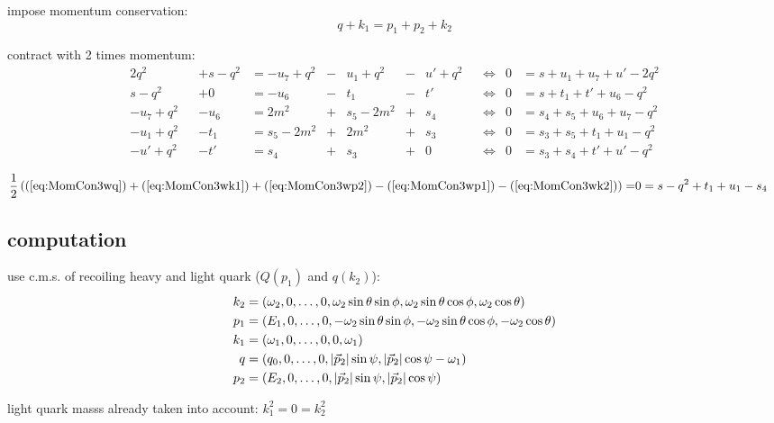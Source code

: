 \documentclass[
  ngerman,		%
  a4paper,		%
  11pt,			%
  DIV=12,		%
  parskip=half  	%
]{scrartcl}
\begin{document}
impose momentum conservation:
\begin{equation}
q+k_1 = p_1+p_2+k_2
\end{equation}

contract with 2 times momentum:
\begin{align}
2q^2 && +s-q^2 &=-u_7+q^2 &-& u_1+q^2 &-& u'+q^2 &&\Leftrightarrow &0 &=s+u_1+u_7+u'-2q^2 \label{eq:MomCon3wq} \\
s-q^2 && +0 &= -u_6 &-& t_1 &-& t' &&\Leftrightarrow &0 &= s+t_1+t'+u_6-q^2 \label{eq:MomCon3wk1}\\
-u_7+q^2 && -u_6 &= 2m^2 &+& s_5-2m^2 &+& s_4 &&\Leftrightarrow &0 &= s_4+s_5+u_6+u_7-q^2 \label{eq:MomCon3wp1}\\
-u_1+q^2 && -t_1 &= s_5-2m^2 &+& 2m^2 &+& s_3 &&\Leftrightarrow &0 &= s_3+s_5+t_1+u_1-q^2 \label{eq:MomCon3wp2}\\
-u'+q^2 && -t' &= s_4 &+& s_3 &+& 0 &&\Leftrightarrow &0 &= s_3+s_4+t'+u'-q^2 \label{eq:MomCon3wk2}
\end{align}

\begin{align}
\frac 1 2 \left((\ref{eq:MomCon3wq}) + (\ref{eq:MomCon3wk1}) + (\ref{eq:MomCon3wp2}) - (\ref{eq:MomCon3wp1}) - (\ref{eq:MomCon3wk2})\right)=&0= s - q^2 + t_1 + u_1 - s_4
\end{align}

\subsection{computation}
use c.m.s. of recoiling heavy and light quark ($Q(p_1)$ and $q(k_2)$):
\begin{align}
k_2 &= (\omega_2,0,\ldots,0,\omega_2\sin\theta\sin\phi,\omega_2\sin\theta\cos\phi,\omega_2\cos\theta)\\
p_1 &= (E_1,0,\ldots,0,-\omega_2\sin\theta\sin\phi,-\omega_2\sin\theta\cos\phi,-\omega_2\cos\theta)\\
k_1 &= (\omega_1,0,\ldots,0,0,\omega_1)\\
q &= (q_0,0,\ldots,0,\left|\vec p_2\right|\sin\psi,\left|\vec p_2\right|\cos\psi-\omega_1)\\
p_2 &= (E_2,0,\ldots,0,\left|\vec p_2\right|\sin\psi,\left|\vec p_2\right|\cos\psi)
\end{align}

light quark masss already taken into account: $k_1^2 = 0 = k_2^2$
\end{document}

